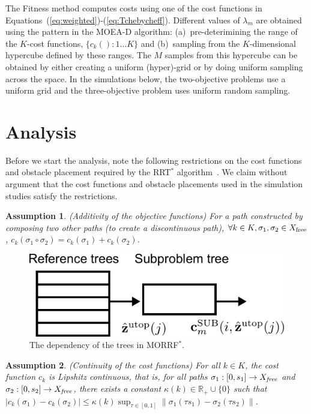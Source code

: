 \documentclass{article}
\newtheorem{asmp}{Assumption}
\begin{document}
The {\sc Fitness} method computes costs using one of the cost functions in Equations~(\ref{eq:weighted})-(\ref{eq:Tchebycheff}).  Different values of $\lambda_m$ are obtained using the pattern in the MOEA-D algorithm: (a)~pre-deterimining the range of the $K$-cost functions, $\{c_{k}():1\ldots K\}$ and (b)~sampling from the $K$-dimensional hypercube defined by these ranges. The $M$ samples from this hypercube can be obtained by either creating a uniform (hyper)-grid or by doing uniform sampling across the space.  In the simulations below, the two-objective problems use a uniform grid and the three-objective problem uses uniform random sampling. 

\section{Analysis} 
\label{sec:theoretic_analysis}

Before we start the analysis, note the following restrictions on the cost functions and obstacle placement required by the RRT$^*$ algorithm~\cite{Karaman.Frazzoli:RSS10}.  
We claim without argument that the cost functions and obstacle placements used in the simulation studies satisfy the restrictions.
\begin{asmp}{(Additivity of the objective functions)}
\label{asmp:additivity}	
For a path constructed by composing two other paths (to create a discontinuous path), $\forall k\in K, \sigma_1,\sigma_2\in X_{\rm free}$, $c_{k}(\sigma_1\circ\sigma_2) = c_{k}(\sigma_1) + c_{k}(\sigma_2)$.
\end{asmp}

\begin{figure}[h]
\centering
\includegraphics[width=0.45\linewidth]{fig/cascade}
\caption{The dependency of the trees in MORRF$^{*}$.}
\label{fig:dependency}
\end{figure}

\begin{asmp}{(Continuity of the cost functions)}
\label{asmp:continuity}
For all $k\in K$, the cost function $c_{k}$ is Lipshitz continuous, that is, for all paths $\sigma_1 : [0, s_{1}] \rightarrow X_{\it free}$ and $ \sigma_2 : [0, s_{2}] \rightarrow X_{\it free}$, there exists a 
constant $\kappa(k)\in \mathbb{R}_{+}\cup \{0 \}$ such that $ | c_{k} ( \sigma_{1} ) - c_{k} ( \sigma_{2} ) | \leq \kappa(k) \sup_{\tau \in [0, 1]} \lVert \sigma_{1} (\tau s_{1}) - \sigma_{2} (\tau s_{2}) \rVert $.
\end{asmp}
\end{document}
